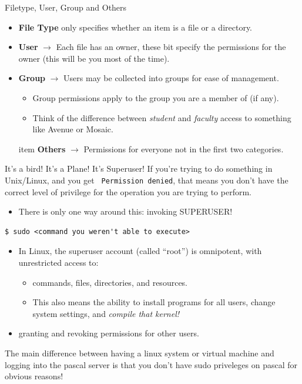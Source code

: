 \documentclass[11pt]{beamer}
\begin{document}
\begin{frame}{Filetype, User, Group and Others}
\begin{itemize}
\item \textbf{File Type} only specifies whether an item is a file or a directory.
\item \textbf{User} $\rightarrow$ Each file has an owner, these bit specify the permissions for the owner (this will be you most of the time).
\item \textbf{Group} $\rightarrow$ Users may be collected into groups for ease of management. 
\begin{itemize}
\item Group permissions apply to the group you are a member of (if any).
\item Think of the difference between \emph{student} and \emph{faculty} access to something like Avenue or Mosaic.  
\end{itemize}
item \textbf{Others} $\rightarrow$ Permissions for everyone not in the first two categories.  
\end{itemize}
\end{frame}

\begin{frame}[fragile=singleslide]{It's a bird! It's a Plane! It's Superuser!}
If you're trying to do something in Unix/Linux, and you get \texttt{ Permission denied}, that means you don't have the correct level of privilege for the operation you are trying to perform.
	\begin{itemize}
	\item There is only one way around this: invoking SUPERUSER!
	\end{itemize}
\begin{lstlisting}[style=terminal]
$ sudo <command you weren't able to execute>
\end{lstlisting}
	\begin{itemize}
	\item In Linux, the superuser account (called ``root'') is omnipotent, with unrestricted access to:
		\begin{itemize}
		\item commands, files, directories, and resources.
		\item This also means the ability to install programs for all users, change system settings, and \emph{compile that kernel!}
		\end{itemize}
	\item granting and revoking permissions for other users.
	\end{itemize}
The main difference between having a linux system or virtual machine and logging into the pascal server is that you don't have sudo priveleges on pascal for obvious reasons! 
\end{frame}
\end{document}
